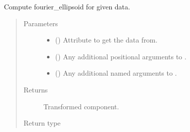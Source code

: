 \documentclass[letterpaper,10pt,english]{sphinxmanual}
\begin{document}
\begin{fulllineitems}
\begin{fulllineitems}
\label{\detokenize{api/base_classes:geology.src.base_spatial.SpatialComponent.fourier_ellipsoid}}
Compute fourier\_ellipsoid for given data.
\begin{quote}\begin{description}
\item[{Parameters}] \leavevmode\begin{itemize}
\item {} 
 (\sphinxstyleliteralemphasis{\sphinxupquote{, }}) \textendash{} Attribute to get the data from.

\item {} 
 () \textendash{} Any additional positional arguments to .

\item {} 
 () \textendash{} Any additional named arguments to .

\end{itemize}

\item[{Returns}] \leavevmode
{} \textendash{} Transformed component.

\item[{Return type}] \leavevmode
{\hyperref[\detokenize{api/base_classes:geology.src.base_spatial.SpatialComponent}]{}}

\end{description}\end{quote}

\end{fulllineitems}



\end{fulllineitems}
\end{document}
